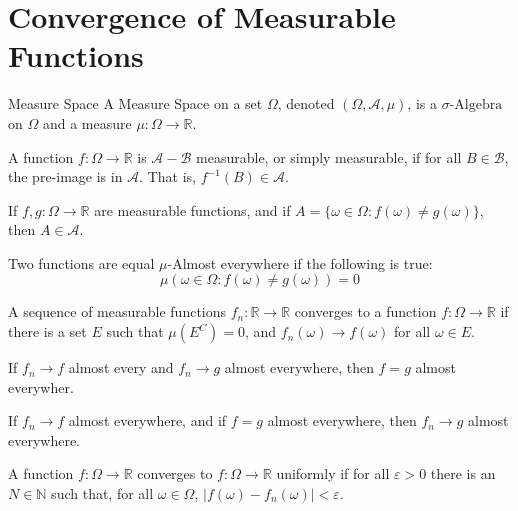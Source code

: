 \documentclass[crop=false,class=book,oneside]{standalone}
\begin{document}
    \section{Convergence of Measurable Functions}
        \begin{ldefinition}{Measure Space}
            A Measure Space on a set $\Omega$, denoted
            $(\Omega,\mathcal{A},\mu)$, is a
            $\sigma\textrm{-Algebra}$ on $\Omega$ and a
            measure $\mu:\Omega\rightarrow\mathbb{R}$.
        \end{ldefinition}
        A function $f:\Omega\rightarrow\mathbb{R}$ is
        $\mathcal{A}-\mathcal{B}$ measurable, or simply
        measurable, if for all $B\in\mathcal{B}$, the
        pre-image is in $\mathcal{A}$. That is,
        $f^{-1}(B)\in\mathcal{A}$.
        \begin{theorem}
            If $f,g:\Omega\rightarrow\mathbb{R}$ are
            measurable functions, and if
            $A=\{\omega\in\Omega:f(\omega)\ne{g}(\omega)\}$,
            then $A\in\mathcal{A}$.
        \end{theorem}
        \begin{definition}
            Two functions are equal $\mu$-Almost everywhere
            if the following is true:
            \begin{equation}
                \mu(\omega\in\Omega:f(\omega)\ne{g}(\omega))
                =0
            \end{equation}
        \end{definition}
        \begin{definition}
            A sequence of measurable functions
            $f_{n}:\mathbb{R}\rightarrow\mathbb{R}$ converges
            to a function $f:\Omega\rightarrow\mathbb{R}$
            if there is a set $E$ such that $\mu(E^{C})=0$,
            and $f_{n}(\omega)\rightarrow{f}(\omega)$ for all
            $\omega\in{E}$.
        \end{definition}
        \begin{theorem}
            If $f_{n}\rightarrow{f}$ almost every and
            $f_{n}\rightarrow{g}$ almost everywhere, then
            $f=g$ almost everywher.
        \end{theorem}
        \begin{theorem}
            If $f_{n}\rightarrow{f}$ almost everywhere, and
            if $f=g$ almost everywhere, then
            $f_{n}\rightarrow{g}$ almost everywhere.
        \end{theorem}
        \begin{definition}
            A function $f:\Omega\rightarrow\mathbb{R}$
            converges to $f:\Omega\rightarrow\mathbb{R}$
            uniformly if for all $\varepsilon>0$ there is
            an $N\in\mathbb{N}$ such that, for all
            $\omega\in\Omega$,
            $|f(\omega)-f_{n}(\omega)|<\varepsilon$.
        \end{definition}
\end{document}
